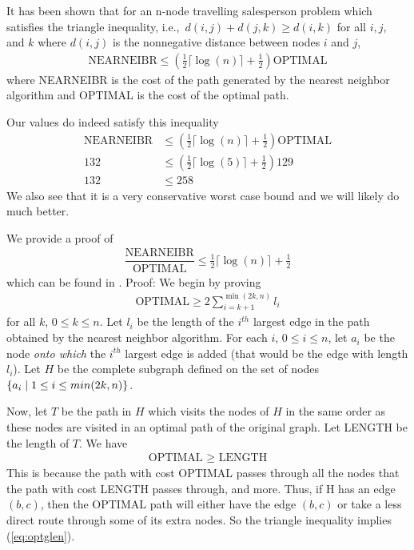 It has been shown \cite{rosenkrantz74} that for an n-node travelling salesperson problem which satisfies the triangle inequality, i.e.,\ $d(i,j) + d(j,k) \geq d(i,k)$ for all $i,j,$ and $k$ where $d(i,j)$ is the nonnegative distance between nodes $i$ and $j$, 
\begin{align*}
\text{NEARNEIBR} \leq (\frac{1}{2} \lceil \log(n) \rceil + \frac{1}{2})\text{OPTIMAL}
\end{align*}
where NEARNEIBR is the cost of the path generated by the nearest neighbor algorithm and OPTIMAL is the cost of the optimal path. 

Our values do indeed satisfy this inequality
\begin{align*}
\text{NEARNEIBR} &\leq (\frac{1}{2} \lceil \log(n) \rceil + \frac{1}{2})\text{OPTIMAL} \\
132 &\leq (\frac{1}{2} \lceil \log(5) \rceil + \frac{1}{2})129 \\
132 &\leq 258 
\end{align*}
We also see that it is a very conservative worst case bound and we will likely do much better.

We provide a proof of
\begin{align}
\dfrac{\text{NEARNEIBR}}{\text{OPTIMAL}} \leq \frac{1}{2} \lceil \log(n) \rceil + \frac{1}{2}
\end{align}
which can be found in \cite{rosenkrantz74}. 
Proof:
We begin by proving 
\begin{align}
\text{OPTIMAL} \geq 2 \sum^{\min(2k,n)}_{i=k+1} l_i \label{eq:showFirst}
\end{align}
for all $k$, $0\leq k \leq n$. 
Let $l_i$ be the length of the $i^{th}$ largest edge in the path obtained by the nearest neighbor algorithm. For each $i$, $0 \leq i \leq n$, let $a_i$ be the node \textit{onto which} the $i^{th}$ largest edge is added (that would be the edge with length $l_i$). Let $H$ be the complete subgraph defined on the set of nodes $\{a_i \hspace{0.1cm} | \hspace{0.1cm} 1 \leq i \leq min(2k,n)\}$.

Now, let $T$ be the path in $H$ which visits the nodes of $H$ in the same order as these nodes are visited in an optimal path of the original graph. Let LENGTH be the length of $T$. We have 
\begin{align}
\text{OPTIMAL $\geq$ LENGTH} \label{eq:optglen}
\end{align}
This is because the path with cost OPTIMAL passes through all the nodes that the path with cost LENGTH passes through, and more. Thus, if H has an edge $(b,c)$, then the OPTIMAL path will either have the edge $(b,c)$ or take a less direct route through some of its extra nodes. So the triangle inequality implies (\ref{eq:optglen}).  
   
